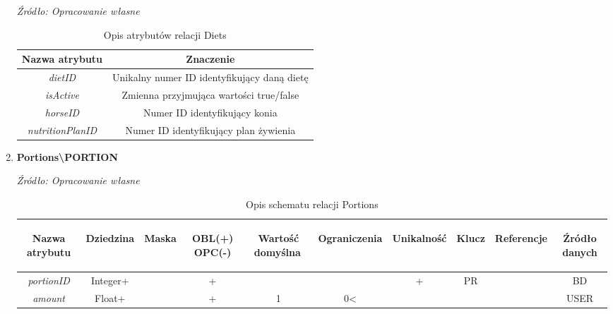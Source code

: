\documentclass[12pt,twoside]{report}
\begin{document}
\begin{enumerate}[start=1,label={\bfseries REL\textbackslash0\arabic*}]
\begin{table}[H]
	\caption{Opis atrybutów relacji Diets}
	\textit{Źródło: Opracowanie własne}
	\label{DietsAttributeDescription}
	\centering
	\begin{tabular}{|c|c|}
		\hline
		Nazwa atrybutu & Znaczenie \\
				\hline
		\textit{dietID}& Unikalny numer ID identyfikujący daną dietę\\
		\hline
		\textit{isActive}& Zmienna przyjmująca wartości true/false \\
		\hline
		\textit{horseID}& Numer ID identyfikujący konia\\
		\hline
		\textit{nutritionPlanID}& Numer ID identyfikujący plan żywienia\\
		\hline
	\end{tabular}
\end{table}
\item \textbf{Portions\textbackslash PORTION} 
\begin{table}[H]
	\caption{Opis schematu relacji Portions}
	\textit{Źródło: Opracowanie własne}
	\label{PortionsRelationSchema}
	\centering
	\begin{tabular}{|c|c|c|c|c|c|c|c|c|c|}
		\hline
		\begin{sideways}Nazwa atrybutu\end{sideways}& 
		\begin{sideways}Dziedzina \end{sideways}& 
		\begin{sideways}Maska \end{sideways}& 
		\begin{sideways}OBL(+) OPC(-)\end{sideways} & 
		\begin{sideways}Wartość domyślna$\ $\end{sideways}& 
		\begin{sideways}Ograniczenia\end{sideways} &
		\begin{sideways}Unikalność \end{sideways}& 
		\begin{sideways}Klucz \end{sideways}& 
		\begin{sideways}Referencje \end{sideways}&
		\begin{sideways}Źródło danych\end{sideways}\\
		\hline
		\textit{portionID}&Integer+&&+&&&+&PR&&BD\\		
		\hline
		\textit{amount}&Float+&&+&1&0<&&&&USER\\
		\hline
	\end{tabular}
\end{table}


\end{enumerate}
\end{document}
